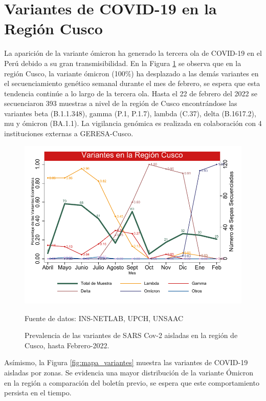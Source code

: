 \documentclass[12pt,a4paper,openany]{book}
\begin{document}
		\section* {Variantes de COVID-19 en la Región Cusco}
		\noindent La aparición de la variante ómicron ha generado la tercera ola de COVID-19 en el Perú debido a su gran transmisibilidad. En la Figura \ref{fig:variantes} se observa que en la región Cusco, la variante ómicron (100$\%$) ha desplazado a las demás variantes en el secuenciamiento genético semanal durante el mes de febrero, se espera que esta tendencia continúe a lo largo de la tercera ola. 
		Hasta el 22 de febrero del 2022 se secuenciaron 393 muestras a nivel de la región de Cusco	encontrándose las variantes beta (B.1.1.348), gamma (P.1, P.1.7), lambda (C.37), delta (B.1617.2), mu y ómicron (BA.1.1). 
		La vigilancia genómica es realizada en colaboración con 4 instituciones externas a GERESA-Cusco.
						
		\begin{figure}[h]
			\caption{Prevalencia de las variantes de SARS Cov-2 aisladas en la región de Cusco, hasta Febrero-2022. }\label{fig:variantes}
			\begin{center}
				\includegraphics[width=0.85\linewidth]{../figuras/variantes.pdf}
			\end{center}
			{\footnotesize {Fuente de datos: INS-NETLAB, UPCH, UNSAAC}}
		\end{figure}
		
	Asímismo, la Figura \ref{fig:mapa_variantes} muestra las variantes de COVID-19 aisladas por zonas. Se evidencia una mayor distribución de la variante Ómicron en la región a comparación del boletín previo, se espera que este comportamiento persista en el tiempo.  
	
\end{document}
